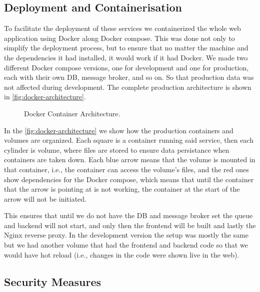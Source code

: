 \subsection{Deployment and Containerisation}



To facilitate the deployment of these services
we containerized the whole web application using Docker \autocite{merkelDockerLightweightLinux2014} along Docker compose.
This was done not only to simplify the deployment process,
but to ensure that no matter the machine and the dependencies it had installed,
it would work if it had Docker.
We made two different Docker compose versions, one for development and one for production,
each with their own \ac{DB}, message broker, and so on.
So that production data was not affected during development.
The complete production architecture is shown in \autoref{fig:docker-architecture}.

\begin{figure}[!htbp]
    \centering
    
    \caption{Docker Container Architecture.}
    \label{fig:docker-architecture}
\end{figure}

In the \autoref{fig:docker-architecture} we show how the production containers and volumes are organized.
Each square is a container running said service,
then each cylinder is volume, where files are stored to ensure data persistance when containers are taken down.
Each blue arrow means that the volume is mounted in that container, i.e., the container can access the volume's files,
and the red ones show dependencies for the Docker compose,
which means that until the container that the arrow is pointing at is not working,
the container at the start of the arrow will not be initiated.

This ensures that until we do not have the \ac{DB} and message broker set
the queue and backend will not start,
and only then the frontend will be built
and lastly the Nginx reverse proxy.
In the development version the setup was mostly the same
but we had another volume that had the frontend and backend code
so that we would have hot reload (i.e., changes in the code were shown live in the web).

\subsection{Security Measures}

